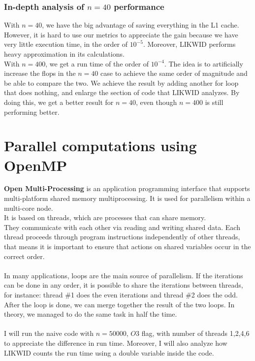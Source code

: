 \documentclass[11pt,a4paper,oneside,titlepage,openright]{book}
\begin{document}
\subsection{In-depth analysis of $n = 40$ performance}

With $ n = 40$, we have the big advantage of saving everything in the L1 cache. However, it is hard to use our metrics to appreciate the gain because we have very little execution time, in the order of $10^{-5}$. Moreover, LIKWID performs heavy approximation in its calculations. \\
With $n= 400$, we get a run time of the order of $10^{-4}$. The idea is to artificially increase the flops in the $n=40$ case to achieve the same order of magnitude and be able to compare the two. We achieve the result by adding another for loop that does nothing, and enlarge the section of code that LIKWID analyzes. 
By doing this, we get a better result for $n = 40$, even though $n = 400$ is still performing better. 


\chapter{Parallel computations using OpenMP}

\textbf{Open Multi-Processing} is an application programming interface that supports multi-platform shared memory multiprocessing. It is used for parallelism within a multi-core node.\\ It is based on threads, which are processes that can share memory. \\They communicate with each other via reading and writing shared data. 
Each thread proceeds through program instructions independently of other threads, that means it is important to ensure that actions on shared variables occur in the correct order.\\\\
In many applications, loops are the main source of parallelism. If the iterations can be done in any order, it is possible to share the iterations between threads, for instance: thread \#1 does the even iterations and thread \#2 does the odd. After the loop is done, we can merge together the result of the two loops. In theory, we managed to do the same task in half the time.\\\\
I will run the naive code with $n = 50000$, $O3$ flag, with number of threads 1,2,4,6 to appreciate the difference in run time. Moreover, I will also analyze how LIKWID counts the run time using a double variable inside the code.\\\\ 
\end{document}
